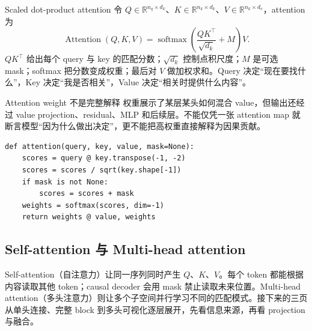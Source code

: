
\begin{importantbox}{Scaled dot-product attention}
令 $Q\in\mathbb{R}^{n_q\times d_k}$、$K\in\mathbb{R}^{n_k\times d_k}$、$V\in\mathbb{R}^{n_k\times d_v}$，attention 为
\[
\operatorname{Attention}(Q,K,V)=\operatorname{softmax}\!\left(\frac{QK^\top}{\sqrt{d_k}}+M\right)V.
\]
$QK^\top$ 给出每个 query 与 key 的匹配分数；$\sqrt{d_k}$ 控制点积尺度；$M$ 是可选 mask；softmax 把分数变成权重；最后对 $V$ 做加权求和。Query 决定“现在要找什么”，Key 决定“我是否相关”，Value 决定“相关时提供什么内容”。
\end{importantbox}

\begin{warningbox}{Attention weight 不是完整解释}
权重展示了某层某头如何混合 value，但输出还经过 value projection、residual、MLP 和后续层。不能仅凭一张 attention map 就断言模型“因为什么做出决定”，更不能把高权重直接解释为因果贡献。
\end{warningbox}


\begin{lstlisting}[caption={Scaled dot-product attention 的教学版伪代码}]
def attention(query, key, value, mask=None):
    scores = query @ key.transpose(-1, -2)
    scores = scores / sqrt(key.shape[-1])
    if mask is not None:
        scores = scores + mask
    weights = softmax(scores, dim=-1)
    return weights @ value, weights
\end{lstlisting}


\subsection{Self-attention 与 Multi-head attention}

Self-attention（自注意力）让同一序列同时产生 $Q$、$K$、$V$。每个 token 都能根据内容读取其他 token；causal decoder 会用 mask 禁止读取未来位置。Multi-head attention（多头注意力）则让多个子空间并行学习不同的匹配模式。接下来的三页从单头连接、完整 block 到多头可视化逐层展开，先看信息来源，再看 projection 与融合。

